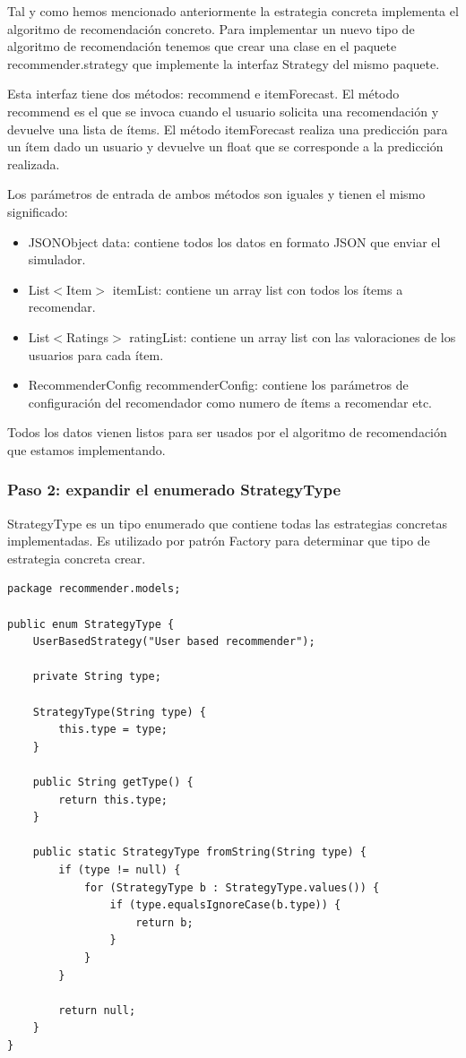 Tal y como hemos mencionado anteriormente la estrategia concreta implementa el algoritmo de recomendación concreto. Para implementar un nuevo tipo de algoritmo de recomendación tenemos que crear una clase en el paquete recommender.strategy que implemente la interfaz Strategy del mismo paquete. 

Esta interfaz tiene dos métodos: recommend e itemForecast. El método recommend es el que se invoca cuando el usuario solicita una recomendación y devuelve una lista de ítems. El método itemForecast realiza una predicción para un ítem dado un usuario y devuelve un float que se corresponde a la predicción realizada.

Los parámetros de entrada de ambos métodos son iguales y tienen el mismo significado:

\begin{itemize}
	\item JSONObject data: contiene todos los datos en formato JSON que enviar el simulador.
	\item List$<$Item$>$ itemList: contiene un array list con todos los ítems a recomendar.
	\item List$<$Ratings$>$ ratingList: contiene un array list con las valoraciones de los usuarios para cada ítem.
	\item RecommenderConfig recommenderConfig: contiene los parámetros de configuración del recomendador como numero de ítems a recomendar etc.
\end{itemize}

Todos los datos vienen listos para ser usados por el algoritmo de recomendación que estamos implementando.

\newpage

\subsubsection{Paso 2: expandir el enumerado StrategyType}

StrategyType es un tipo enumerado que contiene todas las estrategias concretas implementadas. Es utilizado por patrón Factory para determinar que tipo de estrategia concreta crear. 

\begin{lstlisting}[language=xml, frame=single]
package recommender.models;

public enum StrategyType {
	UserBasedStrategy("User based recommender");
	
	private String type;
	
	StrategyType(String type) {
		this.type = type;  
	}
	
	public String getType() {
		return this.type;
	}

	public static StrategyType fromString(String type) {
		if (type != null) {
			for (StrategyType b : StrategyType.values()) {
				if (type.equalsIgnoreCase(b.type)) {
					return b;
				}
			}
		}
	
		return null;
	}
}
\end{lstlisting}

